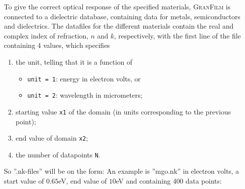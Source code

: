 To give the correct optical response of the specified materials, \textsc{GranFilm} is connected 
to a dielectric database, containing data for metals, semiconductors and dielectrics.
The datafiles for the different materials contain the real and complex index of refraction, $n$ and $k$, 
respectively, with the first line of the file containing 4 values, which specifies
\begin{enumerate}
   \item the unit, telling that it is a function of
      \begin{itemize}
         \item \texttt{unit = 1}: energy in electron volts, or
         \item \texttt{unit = 2}: wavelength in micrometers;
      \end{itemize}
   \item starting value \texttt{x1} of the domain (in units corresponding to the previous point);
   \item end value of domain \texttt{x2};
   \item the number of datapoints \texttt{N}.
\end{enumerate}
So ''.nk-files'' will be on the form:
An example is ''mgo.nk'' in electron volts, a start value of $0.65$eV, end value of $10$eV and containing
400 data points:


